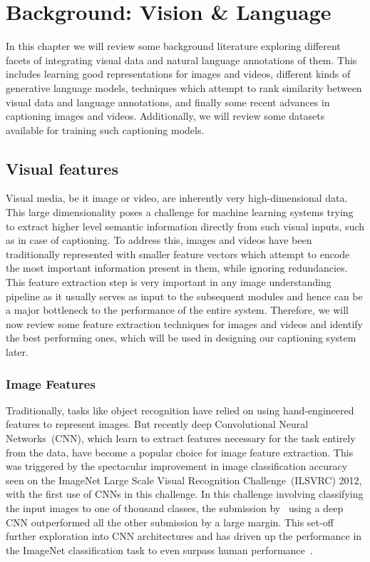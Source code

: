 \chapter{Background: Vision \& Language} \label{chapter:background} 
In this chapter we will review some background literature exploring different
facets of integrating visual data and natural language annotations of them.
This includes learning good representations for images and videos, different
kinds of generative language models, techniques which attempt to rank similarity
between visual data and language annotations, and finally some recent advances
in captioning images and videos.
Additionally, we will review some datasets available for training such captioning
models.

\section{Visual features}
Visual media, be it image or video, are inherently very high-dimensional data.
This large dimensionality poses a challenge for machine learning systems trying
to extract higher level semantic information directly from such visual inputs,
such as in case of captioning.
To address this, images and videos have been traditionally represented with
smaller feature vectors which attempt to encode the most important information
present in them, while ignoring redundancies. 
This feature extraction step is very important in any image understanding
pipeline as it usually serves as input to the subsequent modules and hence can
be a major bottleneck to the performance of the entire system.
Therefore, we will now review some feature extraction techniques for images and
videos and identify the best performing ones, which will be used in designing
our captioning system later.

\subsection{Image Features}
Traditionally, tasks like object recognition have relied on using
hand-engineered features to represent images. 
But recently deep Convolutional Neural Networks~(CNN), which learn to extract
features necessary for the task entirely from the data, have become a popular
choice for image feature extraction.
This was triggered by the spectacular improvement in image classification
accuracy seen on the ImageNet Large Scale Visual Recognition Challenge~(ILSVRC)
2012, with the first use of CNNs in this challenge.
In this challenge involving classifying the input images to one of thousand
classes, the submission by~\cite{Krizhevsky2012} using a deep CNN outperformed
all the other submission by a large margin.
This set-off further exploration into CNN architectures and has driven up the
performance in the ImageNet classification task to even surpass human
performance~\cite{he2015delving}.

